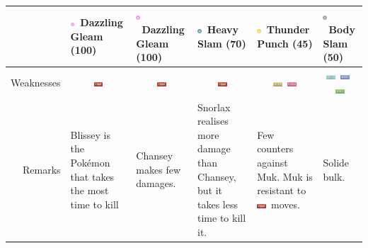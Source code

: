 \documentclass[8pt,aspectratio=169,compress]{beamer}
\newcommand{\fightingfull}{\includegraphics[height=0.15cm]{../../images/type/full/Fighting.png}}
\newcommand{\grassfull}{\includegraphics[height=0.15cm]{../../images/type/full/Grass.png}}
\newcommand{\groundfull}{\includegraphics[height=0.15cm]{../../images/type/full/Ground.png}}
\newcommand{\icefull}{\includegraphics[height=0.15cm]{../../images/type/full/Ice.png}}
\newcommand{\psychicfull}{\includegraphics[height=0.15cm]{../../images/type/full/Psychic.png}}
\newcommand{\waterfull}{\includegraphics[height=0.15cm]{../../images/type/full/Water.png}}
\newcommand{\electricsimp}{\includegraphics[height=0.15cm]{../../images/type/simplified/electric.png}}
\newcommand{\steelsimp}{\includegraphics[height=0.15cm]{../../images/type/simplified/steel.png}}
\newcommand{\fairysimp}{\includegraphics[height=0.15cm]{../../images/type/simplified/fairy.png}}
\newcommand{\normalsimp}{\includegraphics[height=0.15cm]{../../images/type/simplified/normal.png}}
\begin{document}
\begin{frame}
\begin{block}{}
\begin{tiny}
\begin{itemize}
\begin{center}
\begin{tabular}{rp{1.9cm}p{1.9cm}p{1.9cm}p{1.9cm}p{1.9cm}}
&\fairysimp~Dazzling Gleam (100) & \fairysimp~Dazzling Gleam (100) & \steelsimp~Heavy Slam (70)  & \electricsimp~Thunder Punch (45) & \normalsimp~Body Slam (50) \\ \hline
Weaknesses & \multicolumn{1}{c}{\fightingfull} & \multicolumn{1}{c}{\fightingfull} & \multicolumn{1}{c}{\fightingfull} & \multicolumn{1}{c}{\groundfull~\psychicfull} & \multicolumn{1}{c}{\icefull~\waterfull~\grassfull} \\ \hline
Remarks & Blissey is the Pok\'emon that takes the most time to kill & Chansey makes few damages. & Snorlax realises more damage than Chansey, but it takes less time to kill it. & Few counters against Muk. Muk is resistant to \fightingfull~moves. & Solide bulk.  \\
\end{tabular}
\end{center}




\end{itemize}
\end{tiny}
\end{block}
\end{frame}
\end{document}
